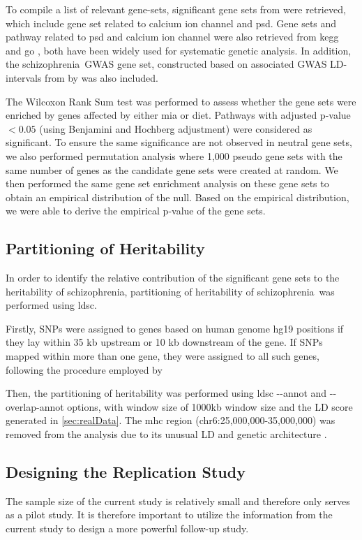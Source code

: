 \documentclass[12pt]{scrbook}
\newcommand*{\scz}{schizophrenia}
\begin{document}
To compile a list of relevant gene-sets, significant gene sets from \citet{purcell2014polygenic,Consortium2015a} were retrieved, which include gene set related to calcium ion channel and \gls{psd}.
Gene sets and pathway related to \gls{psd} and calcium ion channel were also retrieved from \gls{kegg} \citep{Kanehisa2000} and \gls{go} \citep{Consortium2015b}, both have been widely used for systematic genetic analysis.
In addition, the \scz\ \gls{GWAS} gene set, constructed based on associated \gls{GWAS} \gls{LD}-intervals from \citet{Ripke2013} by \citet{purcell2014polygenic} was also included.

The Wilcoxon Rank Sum test was performed to assess whether the gene sets were enriched by genes affected by either \gls{mia} or diet.
Pathways with adjusted p-value $<0.05$ (using Benjamini and Hochberg adjustment) were considered as significant.
To ensure the same significance are not observed in neutral gene sets, we also performed permutation analysis where 1,000 pseudo gene sets with the same number of genes as the candidate gene sets were created at random. 
We then performed the same gene set enrichment analysis on these gene sets to obtain an empirical distribution of the null.
Based on the empirical distribution, we were able to derive the empirical p-value of the gene sets. 

\subsection{Partitioning of Heritability}
In order to identify the relative contribution of the significant gene sets to the heritability of \scz, partitioning of heritability of \scz\ was performed using \gls{ldsc}.

Firstly, \glspl{SNP} were assigned to genes based on human genome hg19 positions if they lay within 35 \gls{kb} upstream or 10 \gls{kb} downstream of the gene.
If \glspl{SNP} mapped within more than one gene, they were assigned to all such genes, following the procedure employed by \citet{Consortium2015a}

Then, the partitioning of heritability was performed using \gls{ldsc} \citep{Bulik-Sullivan2015} -{}-annot and -{}-overlap-annot options, with window size of 1000\gls{kb} window size and the \gls{LD} score generated in \cref{sec:realData}.
The \gls{mhc} region (chr6:25,000,000-35,000,000) was removed from the analysis due to its unusual \gls{LD} and genetic architecture \citep{Finucane2015}.

\subsection{Designing the Replication Study}
The sample size of the current study is relatively small and therefore only serves as a pilot study.
It is therefore important to utilize the information from the current study to design a more powerful follow-up study.
\end{document}

